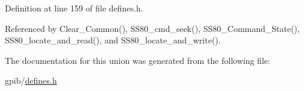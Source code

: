 Definition at line 159 of file defines.\+h.



Referenced by Clear\+\_\+\+Common(), S\+S80\+\_\+cmd\+\_\+seek(), S\+S80\+\_\+\+Command\+\_\+\+State(), S\+S80\+\_\+locate\+\_\+and\+\_\+read(), and S\+S80\+\_\+locate\+\_\+and\+\_\+write().



The documentation for this union was generated from the following file\+:\begin{DoxyCompactItemize}
\item 
gpib/\hyperlink{defines_8h}{defines.\+h}\end{DoxyCompactItemize}

